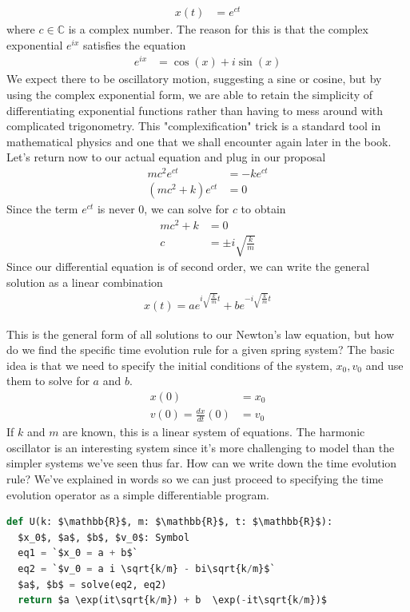 \documentclass[book.tex]{subfiles}
\begin{document}
\begin{align}
    x(t) &= e^{ct}
\end{align}
where $c \in \mathbb{C}$ is a complex number. The reason for this is that the complex exponential $e^{ix}$ satisfies the equation
\begin{align}
    e^{ix} &= \cos(x) + i \sin(x)
\end{align}
We expect there to be oscillatory motion, suggesting a sine or cosine, but by using the complex exponential form, we are able to retain the simplicity of differentiating exponential functions rather than having to mess around with complicated trigonometry. This "complexification" trick is a standard tool in mathematical physics and one that we shall encounter again later in the book. Let's return now to our actual equation and plug in our proposal
\begin{align}
    mc^2 e^{ct} &= -k e^{ct} \\
    (mc^2 + k)e^{ct} &= 0 
\end{align}
Since the term $e^{ct}$ is never 0, we can solve for $c$ to obtain
\begin{align}
    mc^2 + k &= 0 \\
    c &= \pm i\sqrt{\frac{k}{m}}
\end{align}
Since our differential equation is of second order, we can write the general solution as a linear combination
\begin{align}
    x(t) = a e^{i\sqrt{\frac{k}{m}}t} + b e^{-i\sqrt{\frac{k}{m}}t}
\end{align}

This is the general form of all solutions to our Newton's law equation, but how do we find the specific time evolution rule for a given spring system? The basic idea is that we need to specify the initial conditions of the system, $x_0, v_0$ and use them to solve for $a$ and $b$.
\begin{align}
    x(0) &= x_0 \\
    v(0) = \frac{dx}{dt}(0) &= v_0
\end{align}
If $k$ and $m$ are known, this is a linear system of equations. The harmonic oscillator is an interesting system since it's more challenging to model than the simpler systems we've seen thus far. How can we write down the time evolution rule? We've explained in words so we can just proceed to specifying the time evolution operator as a simple differentiable program.

\begin{lstlisting}[language=python]
def U(k: $\mathbb{R}$, m: $\mathbb{R}$, t: $\mathbb{R}$):
  $x_0$, $a$, $b$, $v_0$: Symbol
  eq1 = `$x_0 = a + b$`
  eq2 = `$v_0 = a i \sqrt{k/m} - bi\sqrt{k/m}$`
  $a$, $b$ = solve(eq2, eq2)
  return $a \exp(it\sqrt{k/m}) + b  \exp(-it\sqrt{k/m})$
\end{lstlisting}
\end{document}
